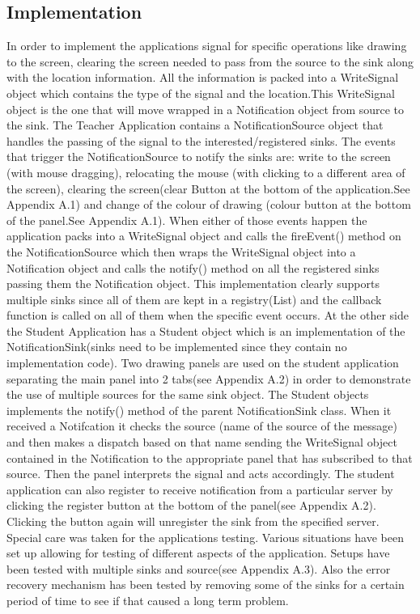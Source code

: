 \documentclass[a4paper,12pt,titlepage]{article}
\begin{document}
\subsection{Implementation}
In order to implement the applications signal for specific operations like drawing to the screen, clearing the screen needed to pass from the source to the sink along with the location information. All the information is packed into a WriteSignal object which contains the type of the signal and the location.This WriteSignal object is the one that will move wrapped in a Notification object from source to the sink. The Teacher Application contains a NotificationSource object that handles the passing of the signal to the interested/registered sinks. The events that trigger the NotificationSource to notify the sinks are: write to the screen (with mouse dragging), relocating the mouse (with clicking to a different area of the screen), clearing the screen(clear Button at the bottom of the application.See Appendix A.1) and change of the colour of drawing (colour button at the bottom of the panel.See Appendix A.1). When either of those events happen the application packs into a WriteSignal object and calls the fireEvent() method on the NotificationSource which then wraps the WriteSignal object into a Notification object and calls the notify() method on all the registered sinks passing them the Notification object. This implementation clearly supports multiple sinks since all of them are kept in a registry(List) and the callback function is called on all of them when the specific event occurs. At the other side the Student Application has a Student object which is an implementation of the NotificationSink(sinks need to be implemented since they contain no implementation code). Two drawing panels are used on the student application separating the main panel into 2 tabs(see Appendix A.2) in order to demonstrate the use of multiple sources for the same sink object. The Student objects implements the notify() method of the parent NotificationSink class. When it received a Notifcation it checks the source (name of the source of the message) and then makes a dispatch based on that name sending the WriteSignal object contained in the Notification to the appropriate panel that has subscribed to that source. Then the panel interprets the signal and acts accordingly. The student application can also register to receive notification from a particular server by clicking the register button at the bottom of the panel(see Appendix A.2). Clicking the button again will unregister the sink from the specified server. Special care was taken for the applications testing. Various situations have been set up allowing for testing of different aspects of the application. Setups have been tested with multiple sinks and source(see Appendix A.3). Also the error recovery mechanism has been tested by removing some of the sinks for a certain period of time to see if that caused a long term problem.
\end{document}

